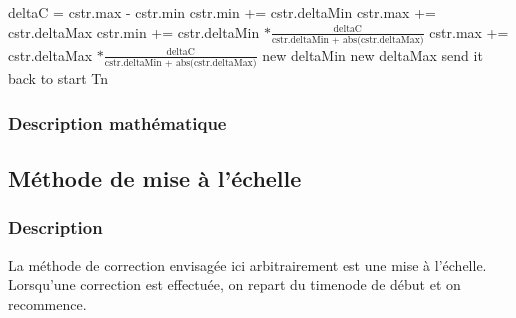 \documentclass[10pt,a4paper]{article}
\begin{document}
	\begin{algorithm}[htp]
		\begin{algorithmic}[2]
				\State deltaC = cstr.max - cstr.min
					\State cstr.min += cstr.deltaMin
					\State cstr.max += cstr.deltaMax
				\Else
					\State cstr.min += cstr.deltaMin $* \frac{\text{deltaC}}{\text{cstr.deltaMin + abs(cstr.deltaMax)}} $
					\State cstr.max += cstr.deltaMax $* \frac{\text{deltaC}}{\text{cstr.deltaMin + abs(cstr.deltaMax)}} $
					\State new deltaMin
					\State new deltaMax
					\State send it back to start Tn
				\EndIf
			\EndFunction
		\end{algorithmic}
	\end{algorithm}
	
		\subsubsection{Description mathématique}
					
	\subsection{Méthode de mise à l'échelle}
		\subsubsection{Description}
 La méthode de correction envisagée ici arbitrairement est une mise à l'échelle.\\
Lorsqu'une correction est effectuée, on repart du timenode de début et on recommence.
\end{document}
